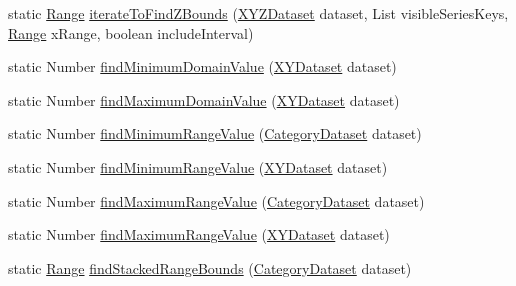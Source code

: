 \begin{DoxyCompactItemize}
\item 
static \mbox{\hyperlink{classorg_1_1jfree_1_1data_1_1_range}{Range}} \mbox{\hyperlink{classorg_1_1jfree_1_1data_1_1general_1_1_dataset_utilities_a2d390ea40d9f15865d18821a78678156}{iterate\+To\+Find\+Z\+Bounds}} (\mbox{\hyperlink{interfaceorg_1_1jfree_1_1data_1_1xy_1_1_x_y_z_dataset}{X\+Y\+Z\+Dataset}} dataset, List visible\+Series\+Keys, \mbox{\hyperlink{classorg_1_1jfree_1_1data_1_1_range}{Range}} x\+Range, boolean include\+Interval)
\item 
static Number \mbox{\hyperlink{classorg_1_1jfree_1_1data_1_1general_1_1_dataset_utilities_a0d821218b55d0b250f0393ac366740b3}{find\+Minimum\+Domain\+Value}} (\mbox{\hyperlink{interfaceorg_1_1jfree_1_1data_1_1xy_1_1_x_y_dataset}{X\+Y\+Dataset}} dataset)
\item 
static Number \mbox{\hyperlink{classorg_1_1jfree_1_1data_1_1general_1_1_dataset_utilities_aa0f23b2decba33ef66f087a4ff7b667c}{find\+Maximum\+Domain\+Value}} (\mbox{\hyperlink{interfaceorg_1_1jfree_1_1data_1_1xy_1_1_x_y_dataset}{X\+Y\+Dataset}} dataset)
\item 
static Number \mbox{\hyperlink{classorg_1_1jfree_1_1data_1_1general_1_1_dataset_utilities_a1b56878458a91408258183f7561b52f2}{find\+Minimum\+Range\+Value}} (\mbox{\hyperlink{interfaceorg_1_1jfree_1_1data_1_1category_1_1_category_dataset}{Category\+Dataset}} dataset)
\item 
static Number \mbox{\hyperlink{classorg_1_1jfree_1_1data_1_1general_1_1_dataset_utilities_a176a7f86b58390d92c082d67dbdbb7ad}{find\+Minimum\+Range\+Value}} (\mbox{\hyperlink{interfaceorg_1_1jfree_1_1data_1_1xy_1_1_x_y_dataset}{X\+Y\+Dataset}} dataset)
\item 
static Number \mbox{\hyperlink{classorg_1_1jfree_1_1data_1_1general_1_1_dataset_utilities_a849e09415d75fa1411cf1ee2f0538a75}{find\+Maximum\+Range\+Value}} (\mbox{\hyperlink{interfaceorg_1_1jfree_1_1data_1_1category_1_1_category_dataset}{Category\+Dataset}} dataset)
\item 
static Number \mbox{\hyperlink{classorg_1_1jfree_1_1data_1_1general_1_1_dataset_utilities_a3c6815c5284c6a0323ccfd6b9aa40cab}{find\+Maximum\+Range\+Value}} (\mbox{\hyperlink{interfaceorg_1_1jfree_1_1data_1_1xy_1_1_x_y_dataset}{X\+Y\+Dataset}} dataset)
\item 
static \mbox{\hyperlink{classorg_1_1jfree_1_1data_1_1_range}{Range}} \mbox{\hyperlink{classorg_1_1jfree_1_1data_1_1general_1_1_dataset_utilities_a842c03439b21eb7fb1b5c8b847328623}{find\+Stacked\+Range\+Bounds}} (\mbox{\hyperlink{interfaceorg_1_1jfree_1_1data_1_1category_1_1_category_dataset}{Category\+Dataset}} dataset)

\end{DoxyCompactItemize}
